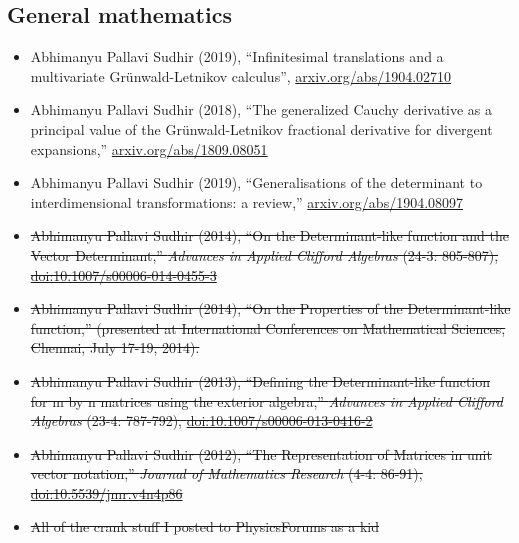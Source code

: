 \documentclass{article}
\newcommand{\disown}[1]{\sout{#1}}
\newcommand{\archive}{\color{lightgray}}
\begin{document}
{\archive

\subsection*{General mathematics}

\begin{itemize}

\item
Abhimanyu Pallavi Sudhir (2019),
``Infinitesimal translations and a multivariate Gr\"unwald-Letnikov calculus'', \href{https://arxiv.org/abs/1904.02710}{arxiv.org/abs/1904.02710}

\item
Abhimanyu Pallavi Sudhir (2018),
``The generalized Cauchy derivative as a principal value of the Gr\"unwald-Letnikov fractional derivative for divergent expansions,'' \href{https://arxiv.org/abs/1809.08051}{arxiv.org/abs/1809.08051}

\item
Abhimanyu Pallavi Sudhir (2019),
``Generalisations of the determinant to interdimensional transformations: a review,'' \href{https://arxiv.org/abs/1904.08097}{arxiv.org/abs/1904.08097}

\item
\disown{Abhimanyu Pallavi Sudhir (2014), 
``On the Determinant-like function and the Vector Determinant,'' 
\emph{Advances in Applied Clifford Algebras} (24-3: 805-807), \href{https://link.springer.com/article/10.1007/s00006-014-0455-3}{doi:10.1007/s00006-014-0455-3}}

\item
\disown{Abhimanyu Pallavi Sudhir (2014),
``On the Properties of the Determinant-like function,'' 
(presented at International Conferences on Mathematical Sciences, Chennai, July 17-19, 2014).}

\item
\disown{Abhimanyu Pallavi Sudhir (2013),
``Defining the Determinant-like function for m by n matrices using the exterior algebra,''
\emph{Advances in Applied Clifford Algebras} (23-4: 787-792),
\href{https://link.springer.com/article/10.1007/s00006-013-0416-2}{doi:10.1007/s00006-013-0416-2}}

\item
\disown{Abhimanyu Pallavi Sudhir (2012),
``The Representation of Matrices in unit vector notation,''
\emph{Journal of Mathematics Research} (4-4: 86-91),
\href{https://dx.doi.org/10.5539/jmr.v4n4p86}{doi:10.5539/jmr.v4n4p86}}

\item \disown{All of the crank stuff I posted to PhysicsForums as a kid}


\end{itemize}}
\end{document}
